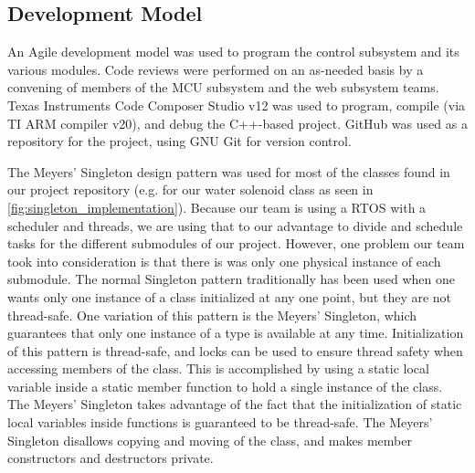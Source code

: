 \subsection{Development Model}
An Agile development model was used to program the control subsystem and its various modules. Code reviews were performed on an as-needed basis by a convening of members of the MCU subsystem and the web subsystem teams. Texas Instruments Code Composer Studio v12 was used to program, compile (via TI ARM compiler v20), and debug the C++-based project. GitHub was used as a repository for the project, using GNU Git for version control.

The Meyers' Singleton design pattern was used for most of the classes found in our project repository (e.g. for our water solenoid class as seen in \ref{fig:singleton_implementation}). Because our team is using a RTOS with a scheduler and threads, we are using that to our advantage to divide and schedule tasks for the different submodules of our project. However, one problem our team took into consideration is that there is was only one physical instance of each submodule. The normal Singleton pattern traditionally has been used when one wants only one instance of a class initialized at any one point, but they are not thread-safe. One variation of this pattern is the Meyers' Singleton, which guarantees that only one instance of a type is available at any time. Initialization of this pattern is thread-safe, and locks can be used to ensure thread safety when accessing members of the class. This is accomplished by using a static local variable inside a static member function to hold a single instance of the class. The Meyers' Singleton takes advantage of the fact that the initialization of static local variables inside functions is guaranteed to be thread-safe. The Meyers' Singleton disallows copying and moving of the class, and makes member constructors and destructors private.

\lstset{style=mystyle}

